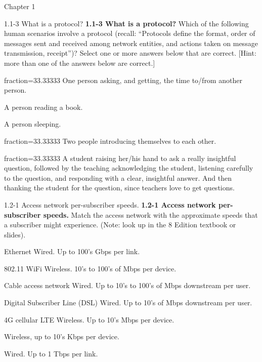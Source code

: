 \documentclass[a4paper]{article}
\begin{document}
\begin{quiz}{Chapter 1}

\begin{multi}[points=1,shuffle=true,multiple]{1.1-3 What is a protocol?}
\textbf{1.1-3 What is a protocol?} 
Which of the following human scenarios involve a protocol 
(recall: ``Protocols define the format, order of messages sent and received among network entities, and actions taken on message transmission, receipt'')? 
Select one or more answers below that are correct. [Hint: more than one of the answers below are correct.]

\item[fraction=33.33333] One person asking, and getting, the time to/from another person.
\item A person reading a book.
\item A person sleeping.
\item[fraction=33.33333] Two people introducing themselves to each other.
\item[fraction=33.33333] A student raising her/his hand to ask a really insightful question, followed by the teaching acknowledging the student, listening carefully to the question, and responding with a clear, insightful answer.  And then thanking the student for the question, since teachers love to get questions.
\end{multi}

\begin{matching}[points=1,shuffle=true]{1.2-1 Access network per-subscriber speeds.}
\textbf{1.2-1 Access network per-subscriber speeds.}
Match the access network with the approximate speeds that a subscriber might experience. 
(Note: look up in the 8 Edition textbook or slides).

\item Ethernet \answer Wired. Up to 100's Gbps per link.
\item 802.11 WiFi \answer Wireless. 10's to 100's of Mbps per device.
\item Cable access network \answer Wired. Up to 10's to 100's of Mbps downstream per user.
\item Digital Subscriber Line (DSL) \answer Wired. Up to 10's of Mbps downstream per user.
\item 4G cellular LTE \answer Wireless. Up to 10's Mbps per device.
\item \answer Wireless, up to 10's Kbps per device.
\item \answer Wired. Up to 1 Tbps per link.
\end{matching}


\end{quiz}
\end{document}
